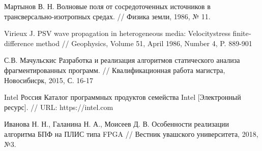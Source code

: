 \begin{thebibliography}{00}
    Мартынов В. Н.
    Волновые поля от сосредоточенных источников в трансверсально-изотропных средах. //
    Физика земли, 1986, № 11.

	Virieux J.
	P­SV wave propagation in heterogeneous media: Velocity­stress finite­difference method //
	Geophysics, Volume 51, April 1986, Number 4, P. 889­-901

	С.В. Мачульскис
	Разработка и реализация алгоритмов статического анализа фрагментированных программ. //
	Квалификационная работа магистра, Новосибисрк, 2015, С. 16-17

	Intel Россия
    Каталог программных продуктов семейства Intel [Электронный ресурс]. //
    URL: https://intel.com

	Иванова Н. Н., Галанина Н. А., Моисеев Д. В.
    Особенности реализации алгоритма БПФ на ПЛИС типа FPGA //
    Вестник увашского университета, 2018, №3.

\end{thebibliography}
\endgroup

\clearpage